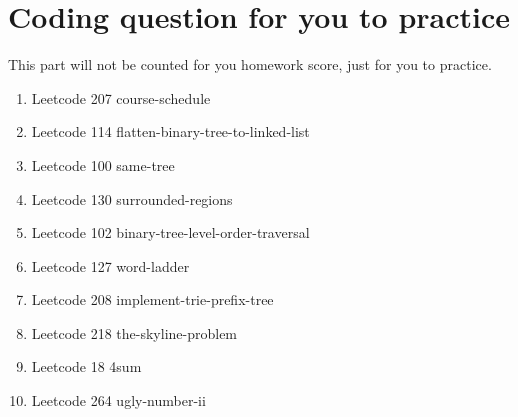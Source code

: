 \documentclass[11pt]{exam}
\begin{document}
\newpage
\section{Coding question for you to practice}
This part will not be counted for you homework score, just for you to practice.
\begin{enumerate}
    \item Leetcode 207 course-schedule
    \item Leetcode 114 flatten-binary-tree-to-linked-list
    \item Leetcode 100 same-tree
    \item Leetcode 130 surrounded-regions
    \item Leetcode 102 binary-tree-level-order-traversal
    \item Leetcode 127 word-ladder
    \item Leetcode 208 implement-trie-prefix-tree
    \item Leetcode 218 the-skyline-problem
    \item Leetcode 18  4sum
    \item Leetcode 264 ugly-number-ii
\end{enumerate}
\end{document}
